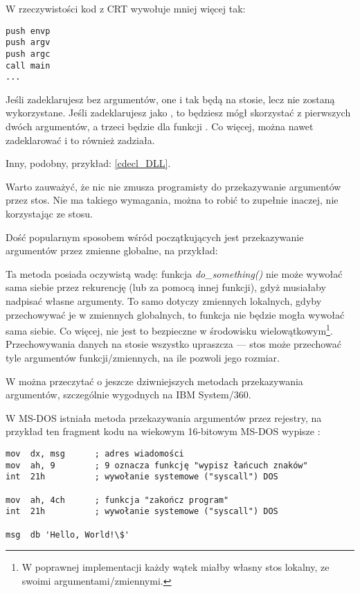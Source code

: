 W rzeczywistości kod z \ac{CRT} wywołuje \main mniej więcej tak:
	
\begin{lstlisting}[style=customasmx86]
push envp
push argv
push argc
call main
...
\end{lstlisting}

Jeśli zadeklarujesz \main bez argumentów, one i tak będą na stosie, lecz nie zostaną wykorzystane.
Jeśli zadeklarujesz \main jako ,
to będziesz mógł skorzystać z pierwszych dwóch argumentów, a trzeci będzie dla funkcji .
Co więcej, można nawet zadeklarować  i to również zadziała.

Inny, podobny, przykład: \ref{cdecl_DLL}.


Warto zauważyć, że nic nie zmusza programisty do przekazywanie argumentów przez stos. Nie ma takiego wymagania, można to robić to zupełnie inaczej, nie korzystając ze stosu.

Dość popularnym sposobem wśród początkujących jest przekazywanie argumentów przez zmienne globalne, na przykład:



Ta metoda posiada oczywistą wadę: funkcja \emph{do\_something()} nie może wywołać sama siebie przez rekurencję (lub za pomocą innej funkcji), gdyż musiałaby nadpisać własne argumenty.
To samo dotyczy zmiennych lokalnych, gdyby przechowywać je w zmiennych globalnych, to funkcja nie będzie mogła wywołać sama siebie.
Co więcej, nie jest to bezpieczne w środowisku wielowątkowym\footnote{W poprawnej implementacji
każdy wątek miałby własny stos lokalny, ze swoimi argumentami/zmiennymi.}.
Przechowywania danych na stosie wszystko upraszcza ---
stos może przechować tyle argumentów funkcji/zmiennych,
na ile pozwoli jego rozmiar.

W  można przeczytać o jeszcze dziwniejszych metodach przekazywania argumentów, szczególnie wygodnych na IBM System/360.


W MS-DOS istniała metoda przekazywania argumentów przez rejestry, na przykład ten fragment kodu na wiekowym 16-bitowym MS-DOS
wypisze :

\begin{lstlisting}[style=customasmx86]
mov  dx, msg      ; adres wiadomości
mov  ah, 9        ; 9 oznacza funkcję "wypisz łańcuch znaków"
int  21h          ; wywołanie systemowe ("syscall") DOS

mov  ah, 4ch      ; funkcja "zakończ program"
int  21h          ; wywołanie systemowe ("syscall") DOS

msg  db 'Hello, World!\$'
\end{lstlisting}

